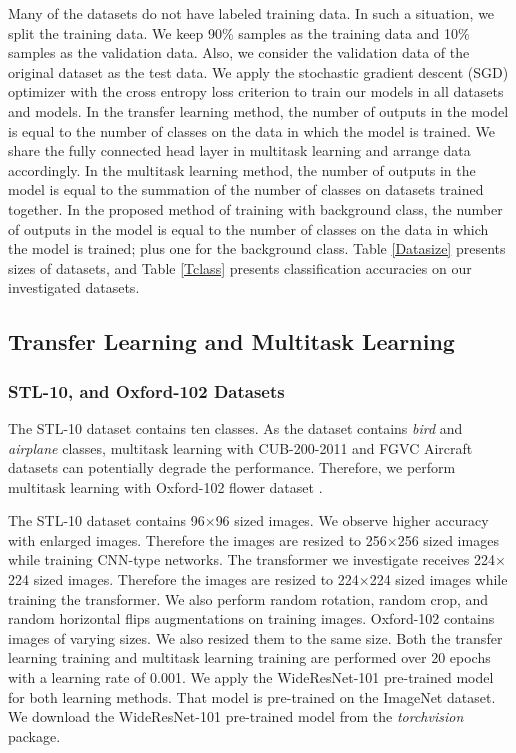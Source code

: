 \documentclass{article}
\begin{document}
Many of the datasets do not have labeled training data. In such a situation, we split the training data. We keep 90\% samples as the training data and 10\% samples as the validation data. Also, we consider the validation data of the original dataset as the test data. We apply the stochastic gradient descent (SGD) optimizer with the cross entropy loss criterion to train our models in all datasets and models.
In the transfer learning method, the number of outputs in the model is equal to the number of classes on the data in which the model is trained.
We share the fully connected head layer in multitask learning and arrange data accordingly. In the multitask learning method, the number of outputs in the model is equal to the summation of the number of classes on datasets trained together. In the proposed method of training with background class, the number of outputs in the model is equal to the number of classes on the data in which the model is trained; plus one for the background class.
Table \ref{Datasize} presents sizes of datasets, and Table \ref{Tclass} presents classification accuracies on our investigated datasets.

\subsection{Transfer Learning and Multitask Learning}
\subsubsection{STL-10, and Oxford-102 Datasets}
The STL-10 dataset \cite{coates2011analysis} contains ten classes. As the dataset contains \emph{bird} and \emph{airplane} classes, multitask learning with CUB-200-2011 and FGVC Aircraft datasets can potentially degrade the performance. Therefore, we perform multitask learning with Oxford-102 flower dataset \cite{nilsback2008automated}.

The STL-10 dataset contains 96$\times$96 sized images. We observe higher accuracy with enlarged images. Therefore the images are resized to 256$\times$256 sized images while training CNN-type networks. The transformer we investigate receives 224$\times$224 sized images. Therefore the images are resized to 224$\times$224 sized images while training the transformer. We also perform random rotation, random crop, and random horizontal flips augmentations on training images. Oxford-102 contains images of varying sizes. We also resized them to the same size. Both the transfer learning training and multitask learning training are performed over 20 epochs with a learning rate of 0.001. We apply the WideResNet-101 pre-trained model for both learning methods. That model is pre-trained on the ImageNet dataset. We download the WideResNet-101 pre-trained model from the \emph{torchvision} package. 
\end{document}
